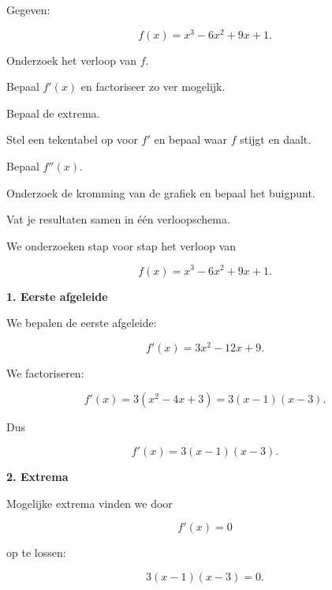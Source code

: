 \documentclass{ximera}
\begin{document}
\begin{oefening}{\oefU\ESS}

Gegeven:

\[
f(x)=x^3-6x^2+9x+1.
\]

Onderzoek het verloop van $f$.

\begin{question}
Bepaal $f'(x)$ en factoriseer zo ver mogelijk.
\end{question}

\begin{question}
Bepaal de extrema.
\end{question}

\begin{question}
Stel een tekentabel op voor $f'$ en bepaal waar $f$ stijgt en daalt.
\end{question}



\begin{question}
Bepaal $f''(x)$.
\end{question}

\begin{question}
Onderzoek de kromming van de grafiek en bepaal het buigpunt.
\end{question}

\begin{question}
Vat je resultaten samen in één verloopschema.
\end{question}

\begin{oplossing}

  We onderzoeken stap voor stap het verloop van
  
  \[
  f(x)=x^3-6x^2+9x+1.
  \]
  
  \textbf{1. Eerste afgeleide}
  
  We bepalen de eerste afgeleide:
  
  \[
  f'(x)=3x^2-12x+9.
  \]
  
  We factoriseren:
  
  \[
  f'(x)
  =3(x^2-4x+3)
  =3(x-1)(x-3).
  \]
  
  Dus
  
  \[
  \boxed{f'(x)=3(x-1)(x-3).}
  \]
  
  \textbf{2. Extrema}
  
  Mogelijke extrema vinden we door
  
  \[
  f'(x)=0
  \]
  
  op te lossen:
  
  \[
  3(x-1)(x-3)=0.
  \]
  

\end{oplossing}
\end{oefening}
\end{document}
